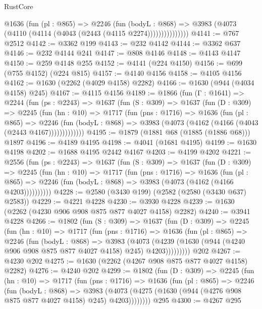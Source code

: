 \begin{lexlean}{RustCore}
\begin{coremodule}
                @1636
                  (fun (pl : @865) =>
                  @2246
                    (fun (bodyL : @868) =>
                    @3983 (@4073 (@4110 (@4114 (@4043 (@2443 (@4115 @2274)))))))))))))))
@4141 := @767 @2512
@4142 := @3362 @199
@4143 := @232 @4142
@4144 := @3362 @637
@4146 := @232 @4144 @241
@4147 := @808 @4146
@4148 := @4143 @4147
@4150 := @259 @4148 @255
@4152 := @4141 (@224 @4150)
@4156 := @699 (@755 @4152) (@224 @815)
@4157 := @4140 @4156
@4158 := @4105 @4156
@4162 := @1630 (@2262 (@4029 @4158) @2282)
@4166 := @1630 (@944 (@4034 @4158) @245)
@4167 := @4115 @4156
@4189 := @1866
    (fun (Γ : @1641) =>
    @2244
      (fun (ps : @2243) =>
      @1637
        (fun (S : @309) =>
        @1637
          (fun (D : @309) =>
          @2245
            (fun (hn : @10) =>
            @1717
              (fun (pns : @1716) =>
              @1636
                (fun (pl : @865) =>
                @2246
                  (fun (bodyL : @868) => @3983 (@4073 (@4162 (@4166 (@4043 (@2443 @4167)))))))))))))
@4195 := @1879 (@1881 @68 (@1885 (@1886 @68))) @1897
@4196 := @4189 @4195
@4198 := @4041 (@1681 @4195)
@4199 := @1630 @4198
@4202 := @1688 @4195 @2442 @4167
@4203 := @4199 @4202
@4221 := @2556
    (fun (ps : @2243) =>
    @1637
      (fun (S : @309) =>
      @1637
        (fun (D : @309) =>
        @2245
          (fun (hn : @10) =>
          @1717
            (fun (pns : @1716) =>
            @1636
              (fun (pl : @865) =>
              @2246 (fun (bodyL : @868) => @3983 (@4073 (@4162 (@4166 @4203))))))))))
@4228 := @2580 (@3430 @199) (@2582 (@2580 (@3430 @637) @2583))
@4229 := @4221 @4228
@4230 := @3930 @4228
@4239 := @1630 (@2262 (@4230 @906 @908 @875 @877 @4027 @4158) @2282)
@4240 := @3941 @4228
@4266 := @1802
    (fun (S : @309) =>
    @1637
      (fun (D : @309) =>
      @2245
        (fun (hn : @10) =>
        @1717
          (fun (pns : @1716) =>
          @1636
            (fun (pl : @865) =>
            @2246
              (fun (bodyL : @868) =>
              @3983
                (@4073
                  (@4239 (@1630 (@944 (@4240 @906 @908 @875 @877 @4027 @4158) @245) @4203)))))))))
    @202
@4267 := @4230 @202
@4275 := @1630 (@2262 (@4267 @908 @875 @877 @4027 @4158) @2282)
@4276 := @4240 @202
@4299 := @1802
    (fun (D : @309) =>
    @2245
      (fun (hn : @10) =>
      @1717
        (fun (pns : @1716) =>
        @1636
          (fun (pl : @865) =>
          @2246
            (fun (bodyL : @868) =>
            @3983 (@4073 (@4275 (@1630 (@944 (@4276 @908 @875 @877 @4027 @4158) @245) @4203))))))))
    @295
@4300 := @4267 @295

\end{coremodule}
\end{lexlean}
